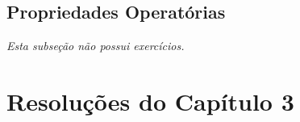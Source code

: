 \clearpage

\subsection{Propriedades Operatórias}
\textit{Esta subseção não possui exercícios.}

\section*{Resoluções do Capítulo 3}
